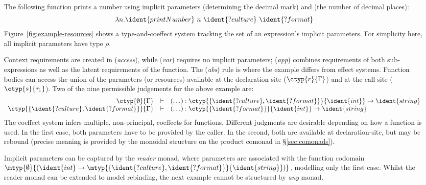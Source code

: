 The following function prints a number using implicit parameters
 (determining the decimal mark) and 
(the number of decimal places):
%
\begin{equation*}
\lambda n . \ident{printNumber}~n~\ident{?culture}~\ident{?format}
\end{equation*}
%
Figure~\ref{fig:example-resources} shows a type-and-coeffect system
tracking the set of an expression's implicit parameters. 
For simplicity here, all implicit parameters have type $\rho$.

Context requirements are created in (\emph{access}), while (\emph{var}) requires no
implicit parameters; (\emph{app}) combines requirements of
both sub-expressions as well as the latent requirements of the
function. The (\emph{abs}) rule is where the example differs from
effect systems.  Function bodies can access the union of the
parameters (or resources) available at the declaration-site ($\ctyp{r}{\Gamma}$) and
at the call-site ($\ctyp{s}{\tau_1}$). Two of the nine permissible
judgements for the above example are:
%
\newcommand{\cfebody}{(\ldots)} %
\begin{equation*}
\begin{array}{rcl}
\ctyp{\emptyset}{\Gamma} &\vdash& \cfebody : \ctyp{\{\ident{?culture}, \ident{?format} \}}{\ident{int}} \rightarrow \ident{string}\\
\ctyp{\{\ident{?culture}, \ident{?format}\}}{\Gamma} &\vdash& \cfebody : \ctyp{\{\ident{?format}\}}{\ident{int}} \rightarrow \ident{string}
\end{array}
\end{equation*}
%
The coeffect system infers multiple, \ie{} non-principal, coeffects for functions.
Different judgments are desirable depending on how a function is used. 
In the first case, both parameters have to be provided by the caller.
In the second, both are available at declaration-site, but  may be
rebound (precise meaning is provided by the monoidal structure on the product comonad in \S\ref{sec:comonads}).

Implicit parameters can be captured by the
\emph{reader} monad, where parameters are associated with the function codomain $\mtyp{\emptyset}{(\ident{int} \rightarrow
  \mtyp{\{\ident{?culture}, \ident{?format} \}}{\ident{string}})}$,
modelling only the first case. Whilst the reader monad can be extended to model rebinding, 
the next example cannot be structured by \emph{any} monad.


